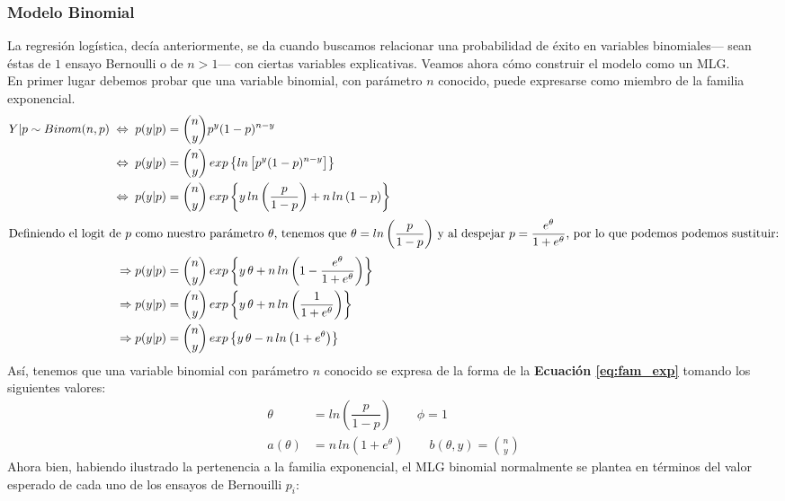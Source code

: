 \subsubsection*{Modelo Binomial}

La regresión logística, decía anteriormente, se da cuando buscamos relacionar una probabilidad de éxito en variables binomiales--- sean éstas de $1$ ensayo Bernoulli o de $n>1$--- con ciertas variables explicativas. Veamos ahora cómo construir el modelo como un MLG.\\

En primer lugar debemos probar que una variable binomial, con parámetro $n$ conocido, puede expresarse como miembro de la familia exponencial. 
\begin{align} \label{eq:Binom_Fam_Exp}
Y|p \sim Binom(n,p) \;\Leftrightarrow\; p(y|p) &= {n\choose y}p^y(1-p)^{n-y} \nonumber \\
 \;\Leftrightarrow\; p(y|p) &= {n\choose y}\,exp\left\lbrace ln\left[p^y(1-p)^{n-y}\right]\right\rbrace \nonumber \\
 \;\Leftrightarrow\; p(y|p) &= {n\choose y}\,exp\left\lbrace y\,ln\left(\dfrac{p}{1-p}\right)+n\,ln\left(1-p\right)\right\rbrace \nonumber \\
\intertext{Definiendo el logit de $p$ como nuestro parámetro $\theta$, tenemos que $\theta = ln\left(\dfrac{p}{1-p}\right)$ y al despejar $p = \dfrac{e^\theta}{1+e^\theta}$, por lo que podemos podemos sustituir:} \nonumber
\Rightarrow p(y|p) &= {n\choose y}\,exp\left\lbrace y\,\theta+n\,ln\left(1-\dfrac{e^\theta}{1+e^\theta}\right)\right\rbrace \nonumber \\
\Rightarrow p(y|p) &= {n\choose y}\,exp\left\lbrace y\,\theta+n\,ln\left(\dfrac{1}{1+e^\theta}\right)\right\rbrace \nonumber \\
\Rightarrow p(y|p) &= {n\choose y}\,exp\left\lbrace y\,\theta-n\,ln\left(1+e^\theta\right)\right\rbrace
\end{align} 
Así, tenemos que una variable binomial con parámetro $n$ conocido se expresa de la forma de la \textbf{Ecuación \ref{eq:fam_exp}} tomando los siguientes valores: 
\begin{align*}
\theta &= ln\left(\dfrac{p}{1-p}\right) \qquad \phi = 1\\
a(\theta) &= n\,ln\left(1+e^\theta\right) \qquad b(\theta,y) = {n\choose y}
\end{align*}
Ahora bien, habiendo ilustrado la pertenencia a la familia exponencial, el MLG binomial normalmente se plantea en términos del valor esperado de cada uno de los ensayos de Bernouilli \parencite[406]{Gelman13} $p_i$:
